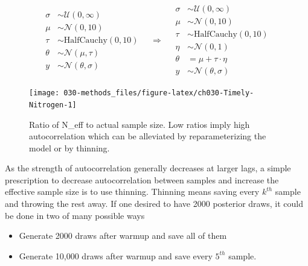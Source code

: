 \documentclass[11pt, oneside, openany]{scrbook}
\providecommand{\tightlist}{%
  \setlength{\itemsep}{0pt}\setlength{\parskip}{0pt}}
\begin{document}

\begin{equation}
  \begin{split}
    \sigma &\sim \mathcal{U}(0, \infty) \\
    \mu &\sim \mathcal{N}(0, 10) \\
    \tau &\sim \mathrm{HalfCauchy}(0, 10) \\
    \theta &\sim \mathcal{N}(\mu, \tau) \\
    y &\sim \mathcal{N}(\theta, \sigma)
  \end{split}
\quad \Longrightarrow \quad
  \begin{split}
    \sigma &\sim \mathcal{U}(0, \infty) \\
    \mu &\sim \mathcal{N}(0, 10) \\
    \tau &\sim \mathrm{HalfCauchy}(0, 10) \\
    \eta &\sim \mathcal{N}(0, 1) \\
    \theta &= \mu + \tau \cdot \eta \\
    y &\sim \mathcal{N}(\theta, \sigma)
  \end{split}
\label{eq:schools-ncp}
\end{equation}

\begin{figure}

{\centering \texttt{[image: 030-methods\_files/figure-latex/ch030-Timely-Nitrogen-1]} 

}

\caption{Ratio of N\_eff to actual sample size. Low ratios imply high autocorrelation which can be alleviated by reparameterizing the model or by thinning.}\label{fig:ch030-Timely-Nitrogen}
\end{figure}

As the strength of autocorrelation generally decreases at larger lags, a simple prescription to decrease autocorrelation between samples and increase the effective sample size is to use thinning. Thinning means saving every \(k^{th}\) sample and throwing the rest away. If one desired to have 2000 posterior draws, it could be done in two of many possible ways

\begin{itemize}
\tightlist
\item
  Generate 2000 draws after warmup and save all of them
\item
  Generate 10,000 draws after warmup and save every \(5^{th}\) sample.
\end{itemize}
\end{document}
